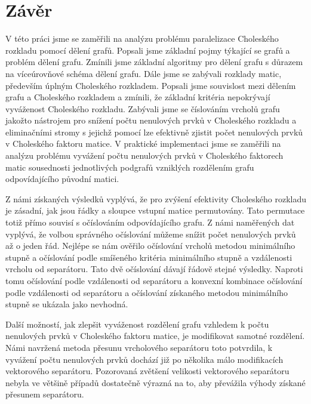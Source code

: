 \documentclass[11pt,american,czech,oneside]{book}
\theoremstyle{plain}
\theoremstyle{definition}
\begin{document}

\chapter*{Závěr}

V této práci jsme se zaměřili na analýzu problému paralelizace Choleského rozkladu pomocí dělení grafů. Popsali jsme základní pojmy týkající se grafů a problém dělení grafu. Zmínili jsme základní algoritmy pro dělení grafu s důrazem na víceúrovňové schéma dělení grafu. Dále jsme se zabývali rozklady matic, především úplným Choleského rozkladem. Popsali jsme souvislost mezi dělením grafu a Choleského rozkladem a zmínili, že základní kritéria nepokrývají vyváženost Choleského rozkladu. Zabývali jsme se číslováním vrcholů grafu jakožto nástrojem pro snížení počtu nenulových prvků v Choleského rozkladu a eliminačními stromy s jejichž pomocí lze efektivně zjistit počet nenulových prvků v Choleského faktoru matice. V praktické implementaci jsme se zaměřili na analýzu problému vyvážení počtu nenulových prvků v Choleského faktorech matic sousednosti jednotlivých podgrafů vzniklých rozdělením grafu odpovídajícího původní matici.

Z námi získaných výsledků vyplývá, že pro zvýšení efektivity Choleského rozkladu je zásadní, jak jsou řádky a sloupce vstupní matice permutovány. Tato permutace totiž přímo souvisí s očíslováním odpovídajícího grafu. Z námi naměřených dat vyplývá, že volbou správného očíslování můžeme snížit počet nenulových prvků až o jeden řád. Nejlépe se nám ověřilo očíslování vrcholů metodou minimálního stupně a očíslování podle smíšeného kritéria minimálního stupně a vzdálenosti vrcholu od separátoru. Tato dvě očíslování dávají řádově stejné výsledky. Naproti tomu očíslování podle vzdálenosti od separátoru a konvexní kombinace očíslování podle vzdálenosti od separátoru a očíslování získaného metodou minimálního stupně se ukázala jako nevhodná.

Další možností, jak zlepšit vyváženost rozdělení grafu vzhledem k počtu nenulových prvků v Choleského faktoru matice, je modifikovat samotné rozdělení. Námi navržená metoda přesunu vrcholového separátoru toto potvrdila, k vyvážení počtu nenulových prvků dochází již po několika málo modifikacích vektorového separátoru. Pozorovaná zvětšení velikosti vektorového separátoru nebyla ve většině případů dostatečně výrazná na to, aby převážila výhody získané přesunem separátoru.
\end{document}
